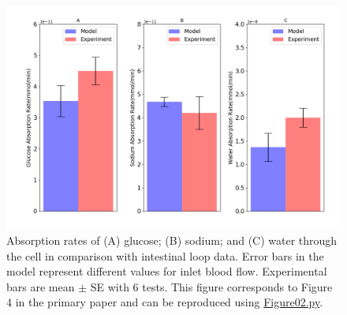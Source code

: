 \documentclass[fleqn,10pt]{physiome}
\begin{document}
\begin{figure}[htb]
\centering
\includegraphics[width=0.9\linewidth]{Figure02}
\caption{Absorption rates of (A) glucose; (B) sodium; and (C) water through the cell in comparison with intestinal loop data. Error bars in the model represent different values for inlet blood flow. Experimental bars are mean $\pm$ SE with $6$ tests. This figure corresponds to Figure 4 in the primary paper and can be reproduced using \href{https://models.physiomeproject.org/workspace/840/rawfile/bc7a5ac43ddbd15d234e66d8cb17df8388d80064/Figure02.py}{Figure02.py}.}
\label{Figure2}
\end{figure}
\end{document}
